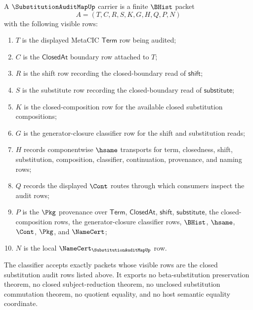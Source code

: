 \begin{definition}
\label{def:substitution-audit-map-carrier}
A $\SubstitutionAuditMapUp$ carrier is a finite $\BHist$ packet
$$
A=(T,C,R,S,K,G,H,Q,P,N)
$$
with the following visible rows:
\begin{enumerate}
\item $T$ is the displayed MetaCIC $\mathsf{Term}$ row being audited;
\item $C$ is the $\mathsf{ClosedAt}$ boundary row attached to $T$;
\item $R$ is the shift row recording the closed-boundary read of $\mathsf{shift}$;
\item $S$ is the substitute row recording the closed-boundary read of $\mathsf{substitute}$;
\item $K$ is the closed-composition row for the available closed substitution compositions;
\item $G$ is the generator-closure classifier row for the shift and substitution reads;
\item $H$ records componentwise $\hsame$ transports for term, closedness, shift, substitution, composition, classifier, continuation, provenance, and naming rows;
\item $Q$ records the displayed $\Cont$ routes through which consumers inspect the audit rows;
\item $P$ is the $\Pkg$ provenance over $\mathsf{Term}$, $\mathsf{ClosedAt}$, $\mathsf{shift}$, $\mathsf{substitute}$, the closed-composition rows, the generator-closure classifier rows, $\BHist$, $\hsame$, $\Cont$, $\Pkg$, and $\NameCert$;
\item $N$ is the local $\NameCert_{\SubstitutionAuditMapUp}$ row.
\end{enumerate}
The classifier accepts exactly packets whose visible rows are the closed substitution audit rows listed above. It exports no beta-substitution preservation theorem, no closed subject-reduction theorem, no unclosed substitution commutation theorem, no quotient equality, and no host semantic equality coordinate.
\end{definition}

